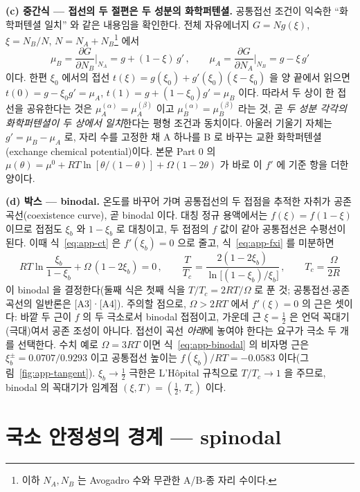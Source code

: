 \documentclass[11pt,a4paper]{article}
\begin{document}
\textbf{(c) 중간식 --- 접선의 두 절편은 두 성분의 화학퍼텐셜.} 공통접선 조건이 익숙한 ``화학퍼텐셜
일치'' 와 같은 내용임을 확인한다. 전체 자유에너지 $G=N g(\xi)$, $\xi=N_B/N$, $N=N_A+N_B$\footnote{이하
$N_A,N_B$ 는 Avogadro 수와 무관한 A/B-종 자리 수이다.} 에서
\begin{equation}
\mu_B=\frac{\partial G}{\partial N_B}\Big|_{N_A}=g+(1-\xi)\,g'\,,\qquad
\mu_A=\frac{\partial G}{\partial N_A}\Big|_{N_B}=g-\xi\,g'
\label{eq:app-mus}
\end{equation}
이다. 한편 $\xi_0$ 에서의 접선 $t(\xi)=g(\xi_0)+g'(\xi_0)(\xi-\xi_0)$ 을 양 끝에서 읽으면
$t(0)=g-\xi_0 g'=\mu_A$, $t(1)=g+(1-\xi_0)g'=\mu_B$ 이다. 따라서 두 상이 한 접선을 공유한다는 것은
$\mu_A^{(\alpha)}=\mu_A^{(\beta)}$ 이고 $\mu_B^{(\alpha)}=\mu_B^{(\beta)}$ 라는 것, 곧 \emph{두 성분
각각의 화학퍼텐셜이 두 상에서 일치}한다는 평형 조건과 동치이다. 아울러 기울기 자체는
$g'=\mu_B-\mu_A$ 로, 자리 수를 고정한 채 A 하나를 B 로 바꾸는 교환 화학퍼텐셜(exchange chemical
potential)이다. 본문 Part 0 의 $\mu(\theta)=\mu^0+RT\ln[\theta/(1-\theta)]+\Omega(1-2\theta)$ 가
바로 이 $f'$ 에 기준 항을 더한 양이다.

\textbf{(d) 박스 --- binodal.} 온도를 바꾸어 가며 공통접선의 두 접점을 추적한 자취가 공존
곡선(coexistence curve), 곧 binodal 이다. 대칭 정규 용액에서는 $f(\xi)=f(1-\xi)$ 이므로 접점도
$\xi_b$ 와 $1-\xi_b$ 로 대칭이고, 두 접점의 $f$ 값이 같아 공통접선은 수평선이 된다. 이때
식~\eqref{eq:app-ct} 은 $f'(\xi_b)=0$ 으로 줄고, 식~\eqref{eq:app-fxi} 를 미분하면
\begin{equation}
\boxed{\;RT\ln\frac{\xi_b}{1-\xi_b}+\Omega\,(1-2\xi_b)=0\,,\qquad
\frac{T}{T_c}=\frac{2(1-2\xi_b)}{\ln\bigl[(1-\xi_b)/\xi_b\bigr]}\,,\qquad
T_c=\frac{\Omega}{2R}\;}
\label{eq:app-binodal}
\end{equation}
이 binodal 을 결정한다(둘째 식은 첫째 식을 $T/T_c=2RT/\Omega$ 로 푼 것; 공통접선$\cdot$공존 곡선의
일반론은 [A3]·[A4]). 주의할 점으로,
$\Omega>2RT$ 에서 $f'(\xi)=0$ 의 근은 셋이다: 바깥 두 근이 $f$ 의 두 극소로서 binodal 접점이고,
가운데 근 $\xi=\tfrac12$ 은 언덕 꼭대기(극대)여서 공존 조성이 아니다. 접선이 곡선 \emph{아래}에
놓여야 한다는 요구가 극소 두 개를 선택한다. 수치 예로 $\Omega=3RT$ 이면
식~\eqref{eq:app-binodal} 의 비자명 근은 $\xi_b^\pm=0.0707/0.9293$ 이고 공통접선 높이는
$f(\xi_b)/RT=-0.0583$ 이다(그림~\ref{fig:app-tangent}). $\xi_b\to\tfrac12$ 극한은 L'H\^opital
규칙으로 $T/T_c\to1$ 을 주므로, binodal 의 꼭대기가 임계점 $(\xi,T)=(\tfrac12,\,T_c)$ 이다.

\section{국소 안정성의 경계 --- spinodal}\label{app:spinodal}
\end{document}
